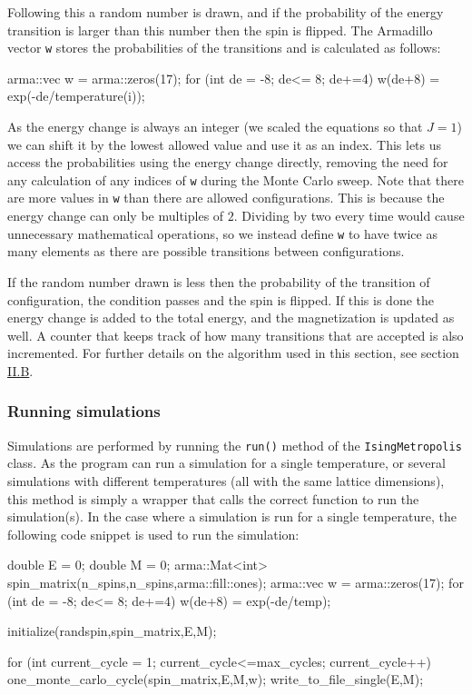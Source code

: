 \documentclass[reprint,english,notitlepage]{revtex4-1}  %
\begin{document}
Following this a random number is drawn, and if the probability of the energy transition is larger than this number then the spin is flipped. The Armadillo \citep{Armadillo} vector \verb+w+ stores the probabilities of the transitions and is calculated as follows:

\begin{cpp}
arma::vec w = arma::zeros(17);
for (int de = -8; de<= 8; de+=4) {
  w(de+8) = exp(-de/temperature(i));
}
\end{cpp} 

As the energy change is always an integer (we scaled the equations so that $J=1$) we can shift it by the lowest allowed value and use it as an index. This lets us access the probabilities using the energy change directly, removing the need for any calculation of any indices of \verb+w+ during the Monte Carlo sweep. Note that there are more values in \verb+w+ than there are allowed configurations. This is because the energy change can only be multiples of $2$. Dividing by two every time would cause unnecessary mathematical operations, so we instead define \verb+w+ to have twice as many elements as there are possible transitions between configurations.

If the random number drawn is less then the probability of the transition of configuration, the condition passes and the spin is flipped. If this is done the energy change is added to the total energy, and the magnetization is updated as well. A counter that keeps track of how many transitions that are accepted is also incremented. For further details on the algorithm used in this section, see section \hyperref[sec:II:b]{II.B}. 


\subsubsection{Running simulations} \label{sec:III:a:iii}

Simulations are performed by running the \verb+run()+ method of the \verb+IsingMetropolis+ class. As the program can run a simulation for a single temperature, or several simulations with different temperatures (all with the same lattice dimensions), this method is simply a wrapper that calls the correct function to run the simulation(s). In the case where a simulation is run for a single temperature, the following code snippet is used to run the simulation:

\begin{cpp}
double E = 0;
double M = 0;
arma::Mat<int> spin_matrix(n_spins,n_spins,arma::fill::ones);
arma::vec w = arma::zeros(17);
for (int de = -8; de<= 8; de+=4) {
  w(de+8) = exp(-de/temp);
}

initialize(randspin,spin_matrix,E,M);

for (int current_cycle = 1; current_cycle<=max_cycles; 
	 current_cycle++){
  one_monte_carlo_cycle(spin_matrix,E,M,w);
  write_to_file_single(E,M);
}
\end{cpp}
\end{document}
